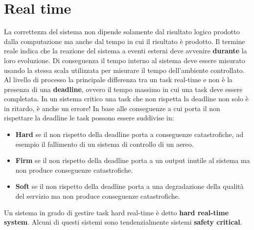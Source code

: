 \documentclass[12pt]{article}
\begin{document}
\section{Real time}
La correttezza del sistema non dipende solamente dal risultato logico prodotto dalla computazione ma anche dal tempo in cui il risultato è prodotto.
Il termine reale indica che la reazione del sistema a eventi esterni deve avvenire \textbf{durante} la loro evoluzione.
Di conseguenza il tempo interno al sistema deve essere misurato usando la stessa scala utilizzata per misurare il tempo dell'ambiente controllato.
Al livello di processo la principale differenza tra un task real-time e non è la presenza di una \textbf{deadline}, ovvero il tempo massimo in cui una task deve essere completata.
In un sistema critico una task che non rispetta la deadline non solo è in ritardo, è anche un errore!
In base alle conseguenze a cui porta il non rispettare la deadline le task possono essere suddivise in:
\begin{itemize}
\item \textbf{Hard} se il non rispetto della deadline porta a conseguenze catastrofiche, ad esempio il fallimento di un sistema di controllo di un aereo.
\item \textbf{Firm} se il non rispetto della deadline porta a un output inutile al sistema ma non produce conseguenze catastrofiche.
\item \textbf{Soft} se il non rispetto della deadline porta a una degradazione della qualità del servizio ma non produce conseguenze catastrofiche.
\end{itemize}
Un sistema in grado di gestire task hard real-time è detto \textbf{hard real-time system}.
Alcuni di questi sistemi sono tendenzialmente sistemi \textbf{safety critical}.
\end{document}

